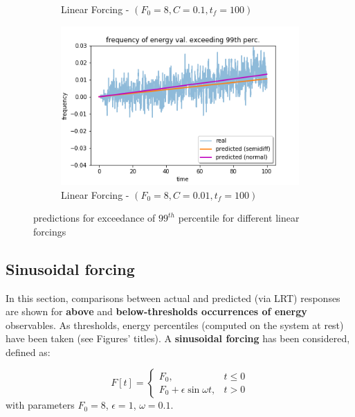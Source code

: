 \documentclass{article}
\begin{document}
\begin{figure}[!ht]
\begin{subfigure}[b]{0.48\textwidth}
		\caption{Linear Forcing - $(F_0=8, C=0.1, t_f=100)$}
		\label{fig:pred_energy_exceed_099q_L_01_10_comp}
	\end{subfigure}%
	\begin{subfigure}[b]{0.48\textwidth}
		\includegraphics[width=1\linewidth]{fig/pred_energy_exceed_099q_L_001_100.png}
		\caption{Linear Forcing - $(F_0=8, C=0.01, t_f=100)$}
		\label{fig:pred_energy_exceed_099q_L_001_100_comp}
	\end{subfigure}
	\caption{predictions for exceedance of $99^{th}$ percentile for different linear forcings}
	\label{fig:pred_energy_exceed_099q_L}
\end{figure}

\clearpage

\subsection{Sinusoidal forcing}

In this section, comparisons between actual and predicted (via LRT) responses are shown for \textbf{above} and \textbf{below-thresholds occurrences of energy} observables.
As thresholds, energy percentiles (computed on the system at rest) have been taken (see Figures' titles).
A \textbf{sinusoidal forcing} has been considered, defined as:

\begin{equation}
F[t]=\left\{\begin{array}{ll}{F_0,} & {t \leq 0} \\ {F_0 + \epsilon\sin{\omega t},} & {t > 0}\end{array}\right.
\end{equation}
with parameters $F_0 = 8$, $\epsilon = 1$, $\omega = 0.1$.
\end{document}
